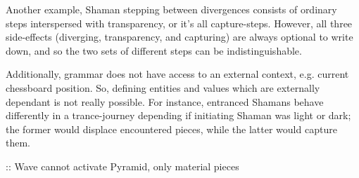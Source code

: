Another example, Shaman stepping between divergences consists of ordinary steps
interspersed with transparency, or it's all capture-steps. However, all three
side-effects (diverging, transparency, and capturing) are always optional to
write down, and so the two sets of different steps can be indistinguishable.

Additionally, grammar does not have access to an external context, e.g. current
chessboard position. So, defining entities and values which are externally dependant
is not really possible. For instance, entranced Shamans behave differently in a
trance-journey depending if initiating Shaman was light or dark; the former would
displace encountered pieces, while the latter would capture them.

\TODO :: Wave cannot activate Pyramid, only material pieces

\clearpage %
